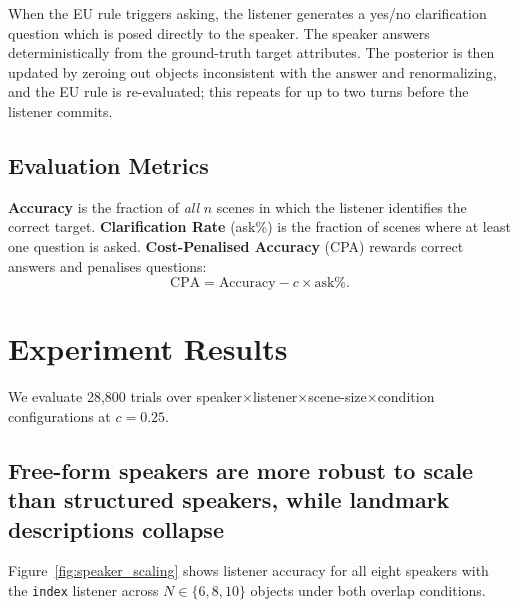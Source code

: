 When the EU rule triggers asking, the listener generates a yes/no clarification
question which is posed directly to the speaker.  The speaker answers
deterministically from the ground-truth target attributes.  The posterior is
then updated by zeroing out objects inconsistent with the answer and
renormalizing, and the EU rule is re-evaluated; this repeats for up to two
turns before the listener commits.

\subsection{Evaluation Metrics}
\label{sec:metrics}

\textbf{Accuracy} is the fraction of \emph{all} $n$ scenes in which the
listener identifies the correct target.
\textbf{Clarification Rate} (ask\%) is the fraction of scenes where at least
one question is asked.  \textbf{Cost-Penalised Accuracy} (CPA) rewards
correct answers and penalises questions:
\begin{equation}
  \text{CPA} = \text{Accuracy} - c \times \text{ask\%}.
  \label{eq:cpa}
\end{equation}


\section{Experiment Results}
\label{sec:results}

We evaluate 28{,}800 trials over speaker$\times$listener$\times$scene-size$\times$condition
configurations at $c{=}0.25$. 

\subsection{Free-form speakers are more robust to scale than
            structured speakers, while landmark descriptions collapse}

Figure~\ref{fig:speaker_scaling} shows listener accuracy for all eight
speakers with the \texttt{index} listener across $N\in\{6,8,10\}$ objects
under both overlap conditions.

